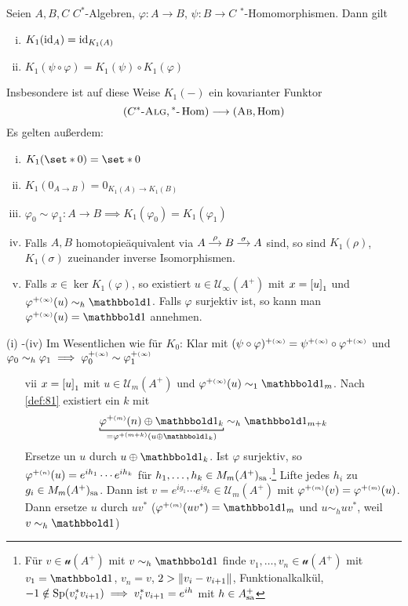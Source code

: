 \begin{proposition}[label=prop:85]
	Seien $A,B,C$ $C^*$-Algebren, $\varphi \colon A \to B$, $\psi \colon B \to C$ $^*$-Homomorphismen.
	Dann gilt
	\begin{enumerate}[(i)]
		\item $K_1({\id_A}) = {\id_{K_1(A)}}$
		\item $K_1(\psi \circ \varphi) = K_1(\psi) \circ K_1(\varphi)$
	\end{enumerate}
	Insbesondere ist auf diese Weise $K_1(-)$ ein kovarianter Funktor
	\[
		\enbrace*{\CSTAR, {^*}\text{-}\Hom} \longrightarrow \enbrace*{\AB, \Hom}
	\]
	Es gelten außerdem:
	\begin{enumerate}[(i)]
		\item $K_1(\set*{0}) = \set*{0}$
		\item $K_1(0_{A\to B}) = 0_{K_1(A) \to K_1(B)}$
		\item $\varphi_0 \sim \varphi_1 \colon A \to B \implies K_1(\varphi_0) = K_1(\varphi_1)$
		\item Falls $A,B$ homotopieäquivalent via \(
			\begin{tikzcd}[cramped,sep=small]
				A \rar["\rho"] & B \rar["\sigma"] & A
			\end{tikzcd}
		\) sind, so sind $K_1(\rho)$, $K_1(\sigma)$ zueinander inverse Isomorphismen.
		\item Falls $x \in \ker K_1(\varphi)$, so existiert $u \in \mathcal{U}_\infty(A^+)$ mit $x= \benbrace*{u}_1$ und $\varphi^{+\ssbrace{\infty}}(u) \sim_h \ind$.
		Falls $\varphi$ surjektiv ist, so kann man $\varphi^{+\ssbrace{\infty}}(u)= \ind$ annehmen.
	\end{enumerate}
\end{proposition}
\begin{beweis}
	(i) -(iv) Im Wesentlichen wie für $K_0$: Klar mit $(\psi \circ \varphi)^{+\ssbrace{\infty}} = \psi^{+\ssbrace{\infty}} \circ \varphi^{+\ssbrace{\infty}}$ und $\varphi_0 \sim_h \varphi_1 \implies \varphi_0^{+\ssbrace{\infty}} \sim \varphi_1^{+\ssbrace{\infty}}$
	\begin{enumerate}[(i)]
		\item[vii] $x=\benbrace*{u}_1$ mit $u \in \mathcal{U}_m(A^+)$ und $\varphi^{+\ssbrace{\infty}}(u) \sim_1 \ind_m$.
		Nach \autoref{def:81} existiert ein $k$ mit
		\[
			\Underbracket{\varphi^{+\ssbrace{m}}(n) \oplus \ind_k}{= \varphi^{+\ssbrace{m+k}}(u \oplus \ind_k)} \sim_h \ind_{m+k}
		\]
		Ersetze un $u$ durch $u \oplus \ind_k$.
		Ist $\varphi$ surjektiv, so $\varphi^{+\ssbrace{n}}(u) = e^{ih_1} \cdots e^{i h_k}$ für $h_1, \ldots ,h_k \in  M_m(A^+)_\sa$.\footnote{Für $v \in \mathcal{u}(A^+)$ mit $v \sim_h \ind$ finde $v_1, \ldots ,v_n \in \mathcal{u}(A^+)$ mit $v_1 = \ind$, $v_n =v$, $2 > \norm*{v_i - v_{i+1}}$, Funktionalkalkül, $-1 \notin \Sp(v_i^* v_{i+1}) \implies v_i^* v_{i+1}= e^{ih}$ mit $h \in A_\sa^+$}
		Lifte jedes $h_i$ zu $g_i \in M_m(A^+)_\sa$.
		Dann ist $v= e^{ig_1} \cdots e^{i g_k} \in \mathcal{U}_m(A^+)$ mit $\varphi^{+\ssbrace{m}}(v) = \varphi^{+\ssbrace{m}}(u)$.
		Dann ersetze $u$ durch $u v^*$ ($\varphi^{+ \ssbrace{m}}(uv^*)=\ind_m$ und $u \sim_h u v^*$, weil $v \sim_h \ind$)
	\end{enumerate}
\end{beweis}

